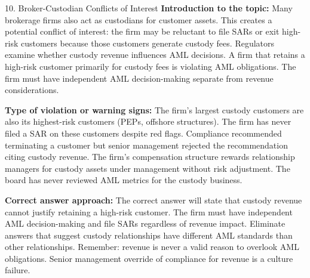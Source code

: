 \documentclass[11pt,a4paper]{beamer}
\begin{document}
\begin{frame}{10. Broker-Custodian Conflicts of Interest}
\tiny
\noindent\textbf{Introduction to the topic:} Many brokerage firms also act as custodians for customer assets. This creates a potential conflict of interest: the firm may be reluctant to file SARs or exit high-risk customers because those customers generate custody fees. Regulators examine whether custody revenue influences AML decisions. A firm that retains a high-risk customer primarily for custody fees is violating AML obligations. The firm must have independent AML decision-making separate from revenue considerations.

\vspace{0.1cm}
\noindent\textbf{Type of violation or warning signs:} The firm's largest custody customers are also its highest-risk customers (PEPs, offshore structures). The firm has never filed a SAR on these customers despite red flags. Compliance recommended terminating a customer but senior management rejected the recommendation citing custody revenue. The firm's compensation structure rewards relationship managers for custody assets under management without risk adjustment. The board has never reviewed AML metrics for the custody business.

\vspace{0.1cm}
\noindent\textbf{Correct answer approach:} The correct answer will state that custody revenue cannot justify retaining a high-risk customer. The firm must have independent AML decision-making and file SARs regardless of revenue impact. Eliminate answers that suggest custody relationships have different AML standards than other relationships. Remember: revenue is never a valid reason to overlook AML obligations. Senior management override of compliance for revenue is a culture failure.
\end{frame}
\end{document}
